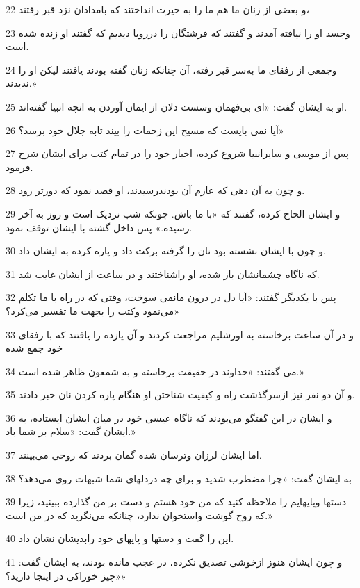 \par 22 و بعضی از زنان ما هم ما را به حیرت انداختند که بامدادان نزد قبر رفتند،
\par 23 وجسد او را نیافته آمدند و گفتند که فرشتگان را دررویا دیدیم که گفتند او زنده شده است.
\par 24 وجمعی از رفقای ما به‌سر قبر رفته، آن چنانکه زنان گفته بودند یافتند لیکن او را ندیدند.»
\par 25 او به ایشان گفت: «ای بی‌فهمان وسست دلان از ایمان آوردن به انچه انبیا گفته‌اند.
\par 26 آیا نمی بایست که مسیح این زحمات را بیند تابه جلال خود برسد؟»
\par 27 پس از موسی و سایرانبیا شروع کرده، اخبار خود را در تمام کتب برای ایشان شرح فرمود.
\par 28 و چون به آن دهی که عازم آن بودندرسیدند، او قصد نمود که دورتر رود.
\par 29 و ایشان الحاح کرده، گفتند که «با ما باش. چونکه شب نزدیک است و روز به آخر رسیده.» پس داخل گشته با ایشان توقف نمود.
\par 30 و چون با ایشان نشسته بود نان را گرفته برکت داد و پاره کرده به ایشان داد.
\par 31 که ناگاه چشمانشان باز شده، او راشناختند و در ساعت از ایشان غایب شد.
\par 32 پس با یکدیگر گفتند: «آیا دل در درون مانمی سوخت، وقتی که در راه با ما تکلم می‌نمود وکتب را بجهت ما تفسیر می‌کرد؟»
\par 33 و در آن ساعت برخاسته به اورشلیم مراجعت کردند و آن یازده را یافتند که با رفقای خود جمع شده
\par 34 می گفتند: «خداوند در حقیقت برخاسته و به شمعون ظاهر شده است.»
\par 35 و آن دو نفر نیز ازسرگذشت راه و کیفیت شناختن او هنگام پاره کردن نان خبر دادند.
\par 36 و ایشان در این گفتگو می‌بودند که ناگاه عیسی خود در میان ایشان ایستاده، به ایشان گفت: «سلام بر شما باد.»
\par 37 اما ایشان لرزان وترسان شده گمان بردند که روحی می‌بینند.
\par 38 به ایشان گفت: «چرا مضطرب شدید و برای چه دردلهای شما شبهات روی می‌دهد؟
\par 39 دستها وپایهایم را ملاحظه کنید که من خود هستم و دست بر من گذارده ببینید، زیرا که روح گوشت واستخوان ندارد، چنانکه می‌نگرید که در من است.»
\par 40 این را گفت و دستها و پایهای خود رابدیشان نشان داد.
\par 41 و چون ایشان هنوز ازخوشی تصدیق نکرده، در عجب مانده بودند، به ایشان گفت: «چیز خوراکی در اینجا دارید؟»
